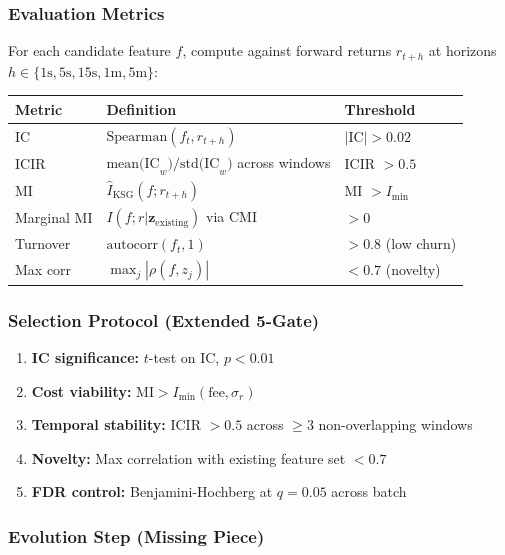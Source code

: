 \documentclass[11pt,a4paper]{article}
\begin{document}
\subsubsection{Evaluation Metrics}

For each candidate feature $f$, compute against forward returns $r_{t+h}$ at horizons $h \in \{1\text{s}, 5\text{s}, 15\text{s}, 1\text{m}, 5\text{m}\}$:

\begin{center}
\begin{tabular}{l l l}
\hline
\textbf{Metric} & \textbf{Definition} & \textbf{Threshold} \\
\hline
IC & $\text{Spearman}(f_t, r_{t+h})$ & $|$IC$| > 0.02$ \\
ICIR & $\text{mean(IC}_w) / \text{std(IC}_w)$ across windows & ICIR $> 0.5$ \\
MI & $\hat{I}_{\text{KSG}}(f; r_{t+h})$ & MI $> I_{\min}$ \\
Marginal MI & $I(f; r | \mathbf{z}_{\text{existing}})$ via CMI & $> 0$ \\
Turnover & $\text{autocorr}(f_t, 1)$ & $> 0.8$ (low churn) \\
Max corr & $\max_j |\rho(f, z_j)|$ & $< 0.7$ (novelty) \\
\hline
\end{tabular}
\end{center}

\subsubsection{Selection Protocol (Extended 5-Gate)}

\begin{enumerate}
    \item \textbf{IC significance:} $t$-test on IC, $p < 0.01$
    \item \textbf{Cost viability:} $\text{MI} > I_{\min}(\text{fee}, \sigma_r)$
    \item \textbf{Temporal stability:} ICIR $> 0.5$ across $\geq 3$ non-overlapping windows
    \item \textbf{Novelty:} Max correlation with existing feature set $< 0.7$
    \item \textbf{FDR control:} Benjamini-Hochberg at $q = 0.05$ across batch
\end{enumerate}

\subsubsection{Evolution Step (Missing Piece)}
\end{document}
